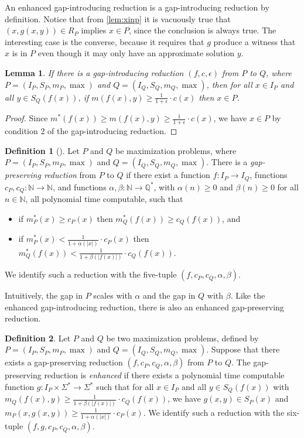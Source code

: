 \documentclass[]{article}
\theoremstyle{plain}
\newtheorem{lemma}{Lemma}
\theoremstyle{definition}
\newtheorem{definition}{Definition}
\begin{document}
An enhanced gap-introducing reduction is a gap-introducing reduction by definition.
Notice that from \autoref{lem:xinp} it is vacuously true that $\left(x, g(x, y)\right) \in R_P$ implies $x \in P$, since the conclusion is always true.
The interesting case is the converse, because it requires that $g$ produce a witness that $x$ is in $P$ even though it may only have an approximate solution $y$.

\begin{lemma}\label{lem:xinp}
  If there is a gap-introducing reduction $(f, c, \epsilon)$ from $P$ to $Q$, where $P = (I_P, S_P, m_P, \max)$ and $Q = (I_Q, S_Q, m_Q, \max)$, then for all $x \in I_P$ and all $y \in S_Q(f(x))$, if $m(f(x), y) \geq \frac{1}{1 + \epsilon} \cdot c(x)$ then $x \in P$.
\end{lemma}
\begin{proof}
  Since $m^*(f(x)) \geq m(f(x), y) \geq \frac{1}{1 + \epsilon} \cdot c(x)$, we have $x \in P$ by condition 2 of the gap-introducing reduction.
\end{proof}

\begin{definition}[{\cite[Section~29.1]{vazirani}}]
  Let $P$ and $Q$ be maximization problems, where $P = (I_P, S_P, m_P, \max)$ and $Q = (I_Q, S_Q, m_Q, \max)$.
  There is a \emph{gap-preserving reduction} from $P$ to $Q$ if there exist a function $f \colon I_P \to I_Q$, functions $c_P, c_Q \colon \mathbb{N} \to \mathbb{N}$, and functions $\alpha, \beta \colon \mathbb{N} \to \mathbb{Q}^*$, with $\alpha(n) \geq 0$ and $\beta(n) \geq 0$ for all $n \in \mathbb{N}$, all polynomial time computable, such that
  \begin{itemize}
  \item if $m^*_P(x) \geq c_P(x)$ then $m^*_Q(f(x)) \geq c_Q(f(x))$, and
  \item if $m^*_P(x) < \frac{1}{1 + \alpha(|x|)} \cdot c_P(x)$ then $m^*_Q(f(x)) < \frac{1}{1 + \beta(|f(x)|)} \cdot c_Q(f(x))$.
  \end{itemize}
  We identify such a reduction with the five-tuple $(f, c_P, c_Q, \alpha, \beta)$.
\end{definition}

Intuitively, the gap in $P$ scales with $\alpha$ and the gap in $Q$ with $\beta$.
Like the enhanced gap-introducing reduction, there is also an enhanced gap-preserving reduction.

\begin{definition}
  Let $P$ and $Q$ be two maximization problems, defined by $P = (I_P, S_P, m_P, \max)$ and $Q = (I_Q, S_Q, m_Q, \max)$.
  Suppose that there exists a gap-preserving reduction $(f, c_P, c_Q, \alpha, \beta)$ from $P$ to $Q$.
  The gap-preserving reduction is \emph{enhanced} if there exists a polynomial time computable function $g \colon I_P \times \Sigma^* \to \Sigma^*$ such that for all $x \in I_P$ and all $y \in S_Q(f(x))$ with $m_Q(f(x), y) \geq \frac{1}{1 + \beta(|f(x)|)} \cdot c_Q(f(x))$, we have $g(x, y) \in S_P(x)$ and $m_P(x, g(x, y)) \geq \frac{1}{1 + \alpha(|x|)} \cdot c_P(x)$.
  We identify such a reduction with the six-tuple $(f, g, c_P, c_Q, \alpha, \beta)$.
\end{definition}
\end{document}
